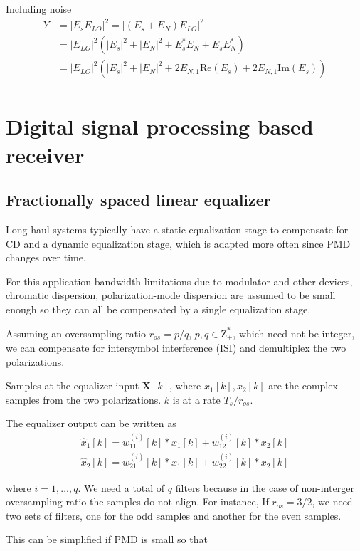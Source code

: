 \documentclass[a4paper]{article}
\begin{document}
Including noise
\begin{align} \nonumber
Y &= |E_sE_{LO}|^2 = |(E_s + E_N)E_{LO}|^2 \\
&= |E_{LO}|^2(|E_s|^2 + |E_N|^2 + E_s^*E_N + E_sE_N^*) \\
&= |E_{LO}|^2(|E_s|^2 + |E_N|^2 + 2E_{N,1}\mathrm{Re}(E_s) + 2E_{N,1}\mathrm{Im}(E_s)) \\
\end{align}


\section{Digital signal processing based receiver}

\subsection{Fractionally spaced linear equalizer}

Long-haul systems typically have a static equalization stage to compensate for CD and a dynamic equalization stage, which is adapted more often since PMD changes over time.

For this application bandwidth limitations due to modulator and other devices, chromatic dispersion, polarization-mode dispersion are assumed to be small enough so they can all be compensated by a single equalization stage. 

Assuming an oversampling ratio $r_{os} = p/q$, $p, q \in \mathrm{Z^*_+}$, which need not be integer, we can compensate for intersymbol interference (ISI) and demultiplex the two polarizations.

Samples at the equalizer input $\bm{X}[k]$, where $x_1[k], x_2[k]$ are the complex samples from the two polarizations. $k$ is at a rate $T_s/r_{os}$.

The equalizer output can be written as
\begin{align}
\hat{x}_{1}[k] = w^{(i)}_{11}[k]\ast x_1[k] + w^{(i)}_{12}[k]\ast x_2[k] \\
\hat{x}_{2}[k] = w^{(i)}_{21}[k]\ast x_1[k] + w^{(i)}_{22}[k]\ast x_2[k]
\end{align}

where $i = 1, \ldots, q$. We need a total of $q$ filters because in the case of non-interger oversampling ratio the samples do not align. For instance, If $r_{os} = 3/2$, we need two sets of filters, one for the odd samples and another for the even samples.

This can be simplified if PMD is small so that 
\end{document}
